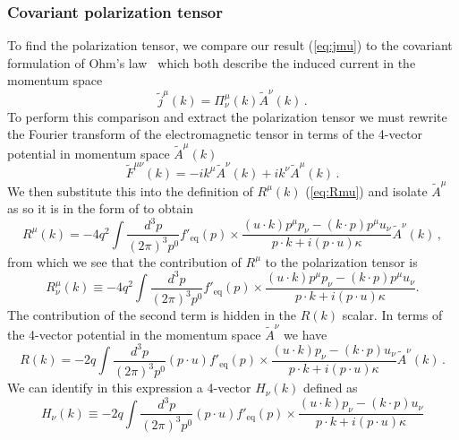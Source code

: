 \subsubsection{Covariant polarization tensor}

To find the polarization tensor, we compare our result (\ref{eq:jmu}) to the covariant formulation of Ohm's law~\cite{Starke:2014tfa} which both describe the induced current in the momentum space
\begin{equation}\label{eq:ohm}
\widetilde{j}^\mu(k) = \Pi^\mu_\nu(k) \widetilde{A}^\nu(k)\,.
\end{equation}
To perform this comparison and extract the polarization tensor we must rewrite the Fourier transform of the electromagnetic tensor in terms of the 4-vector potential in momentum space $\widetilde{A}^\mu(k)$
\begin{equation}\label{eq:ftfmunu}
\widetilde{F}^{\mu\nu}(k) = -i k^\mu \widetilde{A}^\nu(k) + i k^\nu \widetilde{A}^\mu(k)\,.
\end{equation}
We then substitute this into the definition of $R^\mu(k)$ (\ref{eq:Rmu}) and isolate $\widetilde{A}^\mu$ as so it is in the form of  to obtain \cite{Formanek:2021blc}
\begin{equation}
R^\mu(k) = - 4q^2 \int \frac{d^3p}{(2\pi)^3p^0} f'_\mathrm{eq}(p)
\times \frac{(u\cdot k)p^\mu p_\nu - (k \cdot p)p^\mu u_\nu}{p\cdot k + i (p \cdot u) \kappa} \widetilde{A}^\nu(k)\,,
\end{equation}
from which we see that the contribution of $R^\mu$ to the polarization tensor is
\begin{equation}\label{eq:Rmunu}
R^\mu_\nu(k) \equiv - 4q^2 \int \frac{d^3p}{(2\pi)^3p^0} f'_\mathrm{eq}(p)
\times\frac{(u\cdot k)p^\mu p_\nu - (k \cdot p)p^\mu u_\nu}{p\cdot k + i (p \cdot u) \kappa}.
\end{equation}
The contribution of the second term is hidden in the $R(k)$ scalar. In terms of the 4-vector potential in the momentum space $\widetilde{A}^\nu$ we have
\begin{equation}
R(k) = - 2q \int \frac{d^3p}{(2\pi)^3p^0}(p \cdot u)f'_\mathrm{eq}(p)
\times\frac{(u\cdot k)p_\nu - (k \cdot p)u_\nu}{p\cdot k + i (p \cdot u) \kappa}\widetilde{A}^\nu(k)\,.
\end{equation}
We can identify in this expression a 4-vector $H_\nu(k)$ defined as
\begin{equation}\label{eq:Hnu}
H_\nu(k) \equiv - 2q \int \frac{d^3p}{(2\pi)^3p^0}(p \cdot u)f'_\mathrm{eq}(p)
\times\frac{(u\cdot k)p_\nu - (k \cdot p)u_\nu}{p\cdot k + i (p \cdot u) \kappa}
\end{equation}
